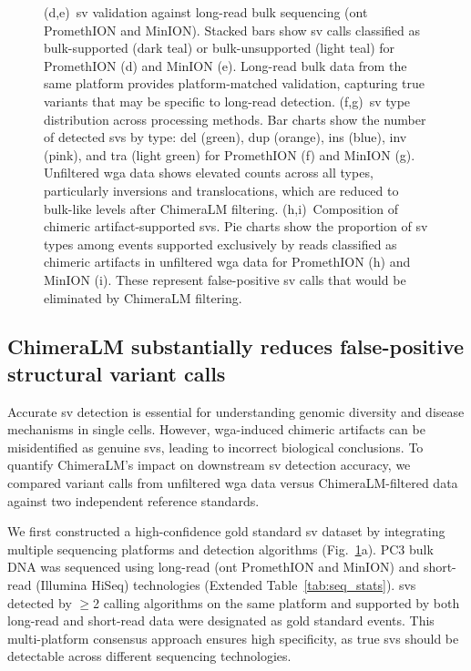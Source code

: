 \documentclass[pdflatex,sn-nature,lineno]{sn-jnl}%
\theoremstyle{thmstyleone}%
\theoremstyle{thmstyletwo}%
\theoremstyle{thmstylethree}%
\begin{document}
\begin{figure}[H]
{		(d,e)~\gls{sv} validation against long-read bulk sequencing (\gls{ont} PromethION and MinION). Stacked bars show \gls{sv} calls classified as bulk-supported (dark teal) or bulk-unsupported (light teal) for PromethION (d) and MinION (e). Long-read bulk data from the same platform provides platform-matched validation, capturing true variants that may be specific to long-read detection.
		(f,g)~\gls{sv} type distribution across processing methods. Bar charts show the number of detected \glspl{sv} by type: \gls{del} (green), \gls{dup} (orange), \gls{ins} (blue), \gls{inv} (pink), and \gls{tra} (light green) for PromethION (f) and MinION (g). Unfiltered \gls{wga} data shows elevated counts across all types, particularly inversions and translocations, which are reduced to bulk-like levels after ChimeraLM filtering.
		(h,i)~Composition of chimeric artifact-supported \glspl{sv}. Pie charts show the proportion of \gls{sv} types among events supported exclusively by reads classified as chimeric artifacts in unfiltered \gls{wga} data for PromethION (h) and MinION (i). These represent false-positive \gls{sv} calls that would be eliminated by ChimeraLM filtering.
	}\label{fig:figure3}
\end{figure}


\subsection*{ChimeraLM substantially reduces false-positive structural variant calls}

Accurate \gls{sv} detection is essential for understanding genomic diversity and disease mechanisms in single cells.
However, \gls{wga}-induced chimeric artifacts can be misidentified as genuine \glspl{sv}, leading to incorrect biological conclusions.
To quantify ChimeraLM's impact on downstream \gls{sv} detection accuracy, we compared variant calls from unfiltered \gls{wga} data versus ChimeraLM-filtered data against two independent reference standards.

We first constructed a high-confidence gold standard \gls{sv} dataset by integrating multiple sequencing platforms and detection algorithms (Fig.~\ref{fig:figure3}a).
PC3 bulk DNA was sequenced using long-read (\gls{ont} PromethION and MinION) and short-read (Illumina HiSeq) technologies (Extended Table~\ref{tab:seq_stats}).
\glspl{sv} detected by $\geq$2 calling algorithms on the same platform and supported by both long-read and short-read data were designated as gold standard events.
This multi-platform consensus approach ensures high specificity, as true \glspl{sv} should be detectable across different sequencing technologies.
\end{document}
